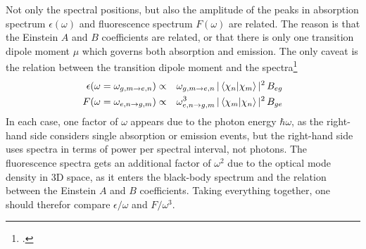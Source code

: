 Not only the spectral positions, but also the amplitude of the peaks in absorption spectrum $\epsilon(\omega)$ and fluorescence spectrum $F(\omega)$ are related. The reason is that the Einstein $A$ and $B$ coefficients are related, or that there is only one transition dipole moment $\mu$ which governs both absorption and emission. The only caveat is the relation between the transition dipole moment and the spectra\footcite[Chapter 5.2]{Parson}
\begin{eqnarray}
   \epsilon(\omega  =  \omega_{g,m \rightarrow e,n} )  & \propto & \omega_{g,m \rightarrow e,n}  \,  | \braket{\chi_n |  \chi_m} |^2 
\, B_{eg} \\
   F(\omega =  \omega_{e,n \rightarrow g,m} ) & \propto & \omega_{e,n \rightarrow g,m}^3 \,  | \braket{\chi_m |  \chi_n} |^2 
\, B_{ge}
\end{eqnarray}
In each case, one factor of $\omega$ appears due to the photon energy $\hbar \omega$, as the right-hand side considers single absorption or emission events,  but the right-hand side uses spectra in terms of power per spectral interval, not photons. The fluorescence spectra gets an additional factor of $\omega^2$ due to the optical mode density in 3D space, as it enters the black-body spectrum and the relation between the Einstein $A$ and $B$ coefficients.
Taking everything together, one should therefor compare $\epsilon / \omega$ and $F / \omega^3$.







\printbibliography[segment=\therefsegment,heading=subbibliography]
